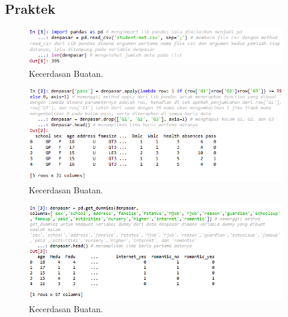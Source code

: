 \subsection{Praktek}


\hfill\break
\begin{figure}[H]
    \includegraphics[width=1\textwidth]{figures/1174006/chapter2/praktek/1.png}
    \centering
    \caption{Kecerdasan Buatan.}
\end{figure}


\hfill\break
\begin{figure}[H]
    \includegraphics[width=1\textwidth]{figures/1174006/chapter2/praktek/2.png}
    \centering
    \caption{Kecerdasan Buatan.}
\end{figure}


\hfill\break
\begin{figure}[H]
    \includegraphics[width=1\textwidth]{figures/1174006/chapter2/praktek/3.png}
    \centering
    \caption{Kecerdasan Buatan.}
\end{figure}

